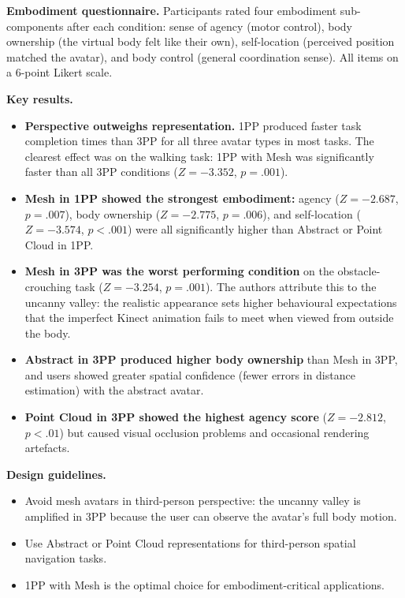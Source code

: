 \documentclass[11pt, a4paper]{article}
\begin{document}
\textbf{Embodiment questionnaire.} Participants rated four embodiment sub-components after each condition: sense of agency (motor control), body ownership (the virtual body felt like their own), self-location (perceived position matched the avatar), and body control (general coordination sense). All items on a 6-point Likert scale.

\textbf{Key results.}
\begin{itemize}[leftmargin=2em]
  \item \textbf{Perspective outweighs representation.} 1PP produced faster task completion times than 3PP for all three avatar types in most tasks. The clearest effect was on the walking task: 1PP with Mesh was significantly faster than all 3PP conditions ($Z = -3.352$, $p = .001$).
  \item \textbf{Mesh in 1PP showed the strongest embodiment:} agency ($Z = -2.687$, $p = .007$), body ownership ($Z = -2.775$, $p = .006$), and self-location ($Z = -3.574$, $p < .001$) were all significantly higher than Abstract or Point Cloud in 1PP.
  \item \textbf{Mesh in 3PP was the worst performing condition} on the obstacle-crouching task ($Z = -3.254$, $p = .001$). The authors attribute this to the uncanny valley: the realistic appearance sets higher behavioural expectations that the imperfect Kinect animation fails to meet when viewed from outside the body.
  \item \textbf{Abstract in 3PP produced higher body ownership} than Mesh in 3PP, and users showed greater spatial confidence (fewer errors in distance estimation) with the abstract avatar.
  \item \textbf{Point Cloud in 3PP showed the highest agency score} ($Z = -2.812$, $p < .01$) but caused visual occlusion problems and occasional rendering artefacts.
\end{itemize}

\textbf{Design guidelines.}
\begin{itemize}[leftmargin=2em]
  \item Avoid mesh avatars in third-person perspective: the uncanny valley is amplified in 3PP because the user can observe the avatar's full body motion.
  \item Use Abstract or Point Cloud representations for third-person spatial navigation tasks.
  \item 1PP with Mesh is the optimal choice for embodiment-critical applications.
\end{itemize}
\end{document}
